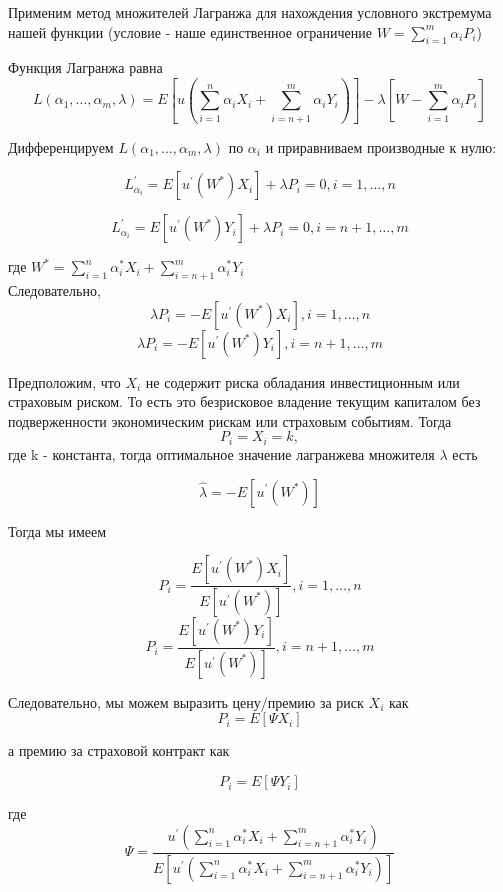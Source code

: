 \documentclass[12pt,a4paper]{article}
\begin{document}
Применим метод множителей Лагранжа для нахождения условного экстремума нашей функции (условие - наше единственное ограничение  $W=  \sum\limits_{i=1}^{m} \alpha_i P_i$)

Функция Лагранжа  равна
$$  L(\alpha_1, \dots, \alpha_m, \lambda)= E \left[ u \left(  \sum\limits_{i=1}^{n} \alpha_i X_i +  \sum\limits_{i=n+1}^{m} \alpha_i Y_i \right)  \right]  - \lambda  \left[ W - \sum\limits_{i=1}^{m} \alpha_i P_i   \right] $$



Дифференцируем $L(\alpha_1, \dots, \alpha_m, \lambda)$ по $\alpha_i$ и приравниваем производные к нулю:

$$ L^{'}_{\alpha_i}= E \left[  u^{'}(W^{*}) X_i \right]  + \lambda P_i = 0  ,   i = 1, \dots, n$$

$$ L^{'}_{\alpha_i}= E \left[  u^{'}(W^{*}) Y_i \right]  + \lambda P_i= 0  ,  i = n+1, \dots, m$$

где $ W^{*} = \sum\limits_{i=1}^{n} \alpha^{*}_i X_i +  \sum\limits_{i=n+1}^{m} \alpha^{*}_i Y_i $\\

Следовательно, 
$$  \lambda P_i = -  E \left[  u^{'}(W^{*}) X_i \right] ,   i = 1, \dots, n$$
$$  \lambda P_i = -  E \left[  u^{'}(W^{*}) Y_i \right] ,   i = n+1, \dots, m$$


Предположим, что $X_i$ не содержит риска обладания инвестиционным или страховым риском. То есть это безрисковое владение текущим капиталом без подверженности экономическим рискам или страховым событиям. Тогда $$ P_i= X_i= k,$$  где k - константа, тогда оптимальное значение лагранжева множителя $\lambda$ есть 

$$ \hat  {\lambda } = -  E \left[  u^{'}(W^{*}) \right] $$

Тогда мы имеем 

$$  P_i = \frac { E \left[  u^{'}(W^{*}) X_i \right] } { E \left[  u^{'}(W^{*}) \right] },   i = 1, \dots, n$$
$$  P_i = \frac { E \left[  u^{'}(W^{*}) Y_i \right] } { E \left[  u^{'}(W^{*}) \right] },   i = n+1, \dots, m$$


Следовательно, мы можем выразить цену/премию за риск $X_i$ как 
$$P_i= E \left[ \Psi X_i  \right]$$

а премию за страховой контракт как 

$$P_i= E \left[ \Psi Y_i  \right]$$

где $$ \Psi =  \frac 
{  u^{'}(\sum\limits_{i=1}^{n} \alpha^{*}_i X_i +  \sum\limits_{i=n+1}^{m} \alpha^{*}_i Y_i )} 
{ E \left[  u^{'}(\sum\limits_{i=1}^{n} \alpha^{*}_i X_i +  \sum\limits_{i=n+1}^{m} \alpha^{*}_i Y_i ) \right] }$$
\end{document}
